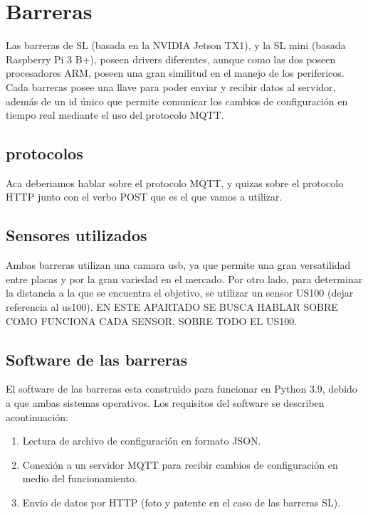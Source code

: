 \section{Barreras}

Las barreras de SL (basada en la NVIDIA Jetson TX1), y la SL mini (basada Raspberry Pi 3 B+), poseen drivers diferentes, aunque como las dos poseen procesadores ARM, poseen una gran similitud en el manejo de los perifericos. Cada barreras posee una llave para poder enviar y recibir datos al servidor, además de un id único que permite comunicar los cambios de configuración en tiempo real mediante el uso del protocolo MQTT.

\subsection{protocolos}

Aca deberiamos hablar sobre el protocolo MQTT, y quizas sobre el protocolo HTTP junto con el verbo POST que es el que vamos a utilizar.

\subsection{Sensores utilizados}

Ambas barreras utilizan una camara usb, ya que permite una gran versatilidad entre placas y por la gran variedad en el mercado. Por otro lado, para determinar la distancia a la que se encuentra el objetivo, se utilizar un sensor US100 (dejar referencia al us100). EN ESTE APARTADO SE BUSCA HABLAR SOBRE COMO FUNCIONA CADA SENSOR, SOBRE TODO EL US100.

\subsection{Software de las barreras}

El software de las barreras esta construido para funcionar en Python 3.9, debido a que ambas sistemas operativos. Los requisitos del software se describen acontinuación:

\begin{enumerate}
    \item Lectura de archivo de configuración en formato JSON.
    \item Conexión a un servidor MQTT para recibir cambios de configuración en medio del funcionamiento.
    \item Envio de datos por HTTP (foto y patente en el caso de las barreras SL).
\end{enumerate}

